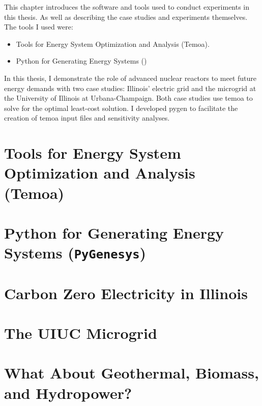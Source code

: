 This chapter introduces the software and tools used to conduct experiments in this
thesis. As well as describing the case studies and experiments themselves.
The tools I used were:
\begin{itemize}
  \item Tools for Energy System Optimization and Analysis (Temoa).
  \item Python for Generating Energy Systems (\pygen)
\end{itemize}
In this thesis, I demonstrate the role of advanced nuclear reactors to meet future
energy demands with two case studies: Illinois’ electric grid and the microgrid
at the University of Illinois at Urbana-Champaign. Both case studies use \gls{temoa}
to solve for the optimal least-cost solution. I developed \gls{pygen} to
facilitate the creation of \gls{temoa} input files and sensitivity analyses.

\section{Tools for Energy System Optimization and Analysis (Temoa)}


\section{Python for Generating Energy Systems (\texttt{PyGenesys})}



\section{Carbon Zero Electricity in Illinois}
\label{section:ilmodel}


\section{The UIUC Microgrid}
\label{section:uiucmodel}


\section{What About Geothermal, Biomass, and Hydropower?}

